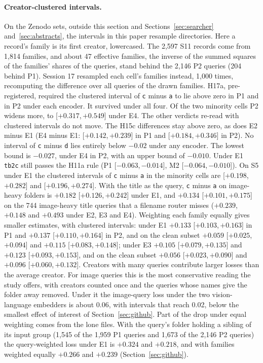 \documentclass[11pt]{article}
\newcommand{\rep}[1]{\texttt{#1}}
\newcommand{\ci}[2]{[\ensuremath{#1},\,\ensuremath{#2}]}  %
\begin{document}
\paragraph{Creator-clustered intervals.} On the Zenodo sets, outside this section and Sections~\ref{sec:searcher} and~\ref{sec:abstracts}, the intervals in this paper resample directories. Here a record's family is its first creator, lowercased. The 2,597 S11 records come from 1,814 families, and about 47 effective families, the inverse of the summed squares of the families' shares of the queries, stand behind the 2,146 P2 queries (204 behind P1). Session 17 resampled each cell's families instead, 1,000 times, recomputing the difference over all queries of the drawn families. H17a, pre-registered, required the clustered interval of \rep{c} minus \rep{a} to lie above zero in P1 and in P2 under each encoder. It survived under all four. Of the two minority cells P2 widens more, to \ci{+0.317}{+0.549} under E4. The other verdicts re-read with clustered intervals do not move. The H15c differences stay above zero, as does E2 minus E1 (E4 minus E1: \ci{+0.142}{+0.239} in P1 and \ci{+0.184}{+0.346} in P2). No interval of \rep{c} minus \rep{d} lies entirely below $-0.02$ under any encoder. The lowest bound is $-0.027$, under E4 in P2, with an upper bound of $-0.010$. Under E1 \rep{tb2c} still passes the H11a rule (P1 \ci{-0.063}{-0.014}, M2 \ci{-0.064}{-0.010}). On S5 under E1 the clustered intervals of \rep{c} minus \rep{a} in the minority cells are \ci{+0.198}{+0.282} and \ci{+0.196}{+0.274}. With the title as the query, \rep{c} minus \rep{a} on image-heavy folders is $+0.182$ \ci{+0.126}{+0.242} under E1, and $+0.134$ \ci{+0.101}{+0.175} on the 744 image-heavy title queries that a filename router misses ($+0.239$, $+0.148$ and $+0.493$ under E2, E3 and E4). Weighting each family equally gives smaller estimates, with clustered intervals: under E1 $+0.133$ \ci{+0.103}{+0.163} in P1 and $+0.137$ \ci{+0.110}{+0.164} in P2, and on the clean subset $+0.059$ \ci{+0.025}{+0.094} and $+0.115$ \ci{+0.083}{+0.148}; under E3 $+0.105$ \ci{+0.079}{+0.135} and $+0.123$ \ci{+0.093}{+0.153}, and on the clean subset $+0.056$ \ci{+0.023}{+0.090} and $+0.096$ \ci{+0.060}{+0.132}. Creators with many queries contribute larger losses than the average creator. For image queries this is the most conservative reading the study offers, with creators counted once and the queries whose names give the folder away removed. Under it the image-query loss under the two vision-language embedders is about 0.06, with intervals that reach 0.02, below the smallest effect of interest of Section~\ref{sec:github}. Part of the drop under equal weighting comes from the lone files. With the query's folder holding a sibling of its input group (1,545 of the 1,959 P1 queries and 1,673 of the 2,146 P2 queries) the query-weighted loss under E1 is $+0.324$ and $+0.218$, and with families weighted equally $+0.266$ and $+0.239$ (Section~\ref{sec:github}).
\end{document}
